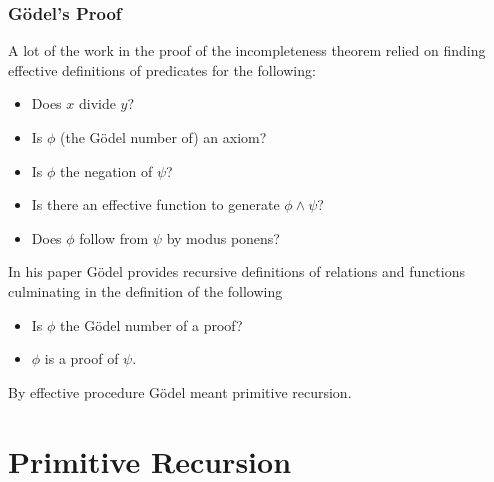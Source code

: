 \documentclass{beamer}
\begin{document}
\begin{frame}
	\frametitle{G\"{o}del's Proof}

	A lot of the work in the proof of the incompleteness theorem relied on finding effective definitions of predicates for the following: 

	\begin{itemize}
		\item Does $x$ divide $y$?
		\item Is $\phi$ (the G\"{o}del number of) an axiom? 
		\item Is $\phi$ the negation of $\psi$? 
		\item Is there an effective function to generate $\phi \land \psi$? 
		\item Does $\phi$ follow from $\psi$ by modus ponens?
	\end{itemize}

	In his paper G\"{o}del provides recursive definitions of relations and functions culminating in the definition of the following

	\begin{itemize}
		\item Is $\phi$ the G\"{o}del number of a proof?
		\item $\phi$ is a proof of $\psi$. 
	\end{itemize}

	\vspace{0.5cm}

	By effective procedure G\"{o}del meant primitive recursion.

\end{frame}

\section{Primitive Recursion}
\end{document}
